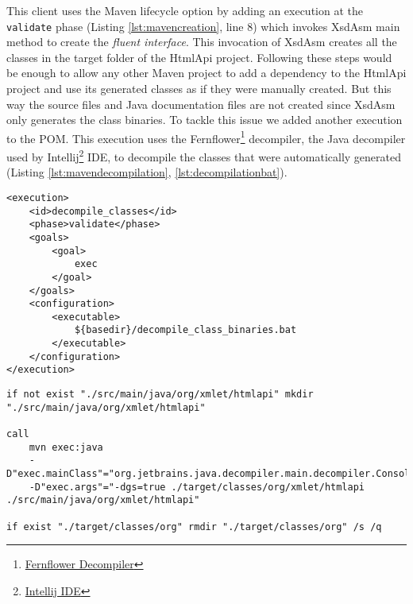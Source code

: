 \noindent
This client uses the Maven lifecycle option by adding an execution at the \texttt{validate} phase (Listing \ref{lst:mavencreation}, line 8) which invokes XsdAsm main method to create the \textit{fluent interface}. This invocation of XsdAsm creates all the classes in the target folder of the HtmlApi project. Following these steps would be enough to allow any other Maven project to add a dependency to the HtmlApi project and use its generated classes as if they were manually created. But this way the source files and Java documentation files are not created since XsdAsm only generates the class binaries. To tackle this issue we added another execution to the \ac{POM}. This execution uses the Fernflower\footnote{\href{https://mvnrepository.com/artifact/org.jboss.windup.decompiler/decompiler-fernflower/4.0.0.Final}{Fernflower Decompiler}} decompiler, the Java decompiler used by Intellij\footnote{\href{https://www.jetbrains.com/idea/}{Intellij IDE}} \ac{IDE}, to decompile the classes that were automatically generated (Listing \ref{lst:mavendecompilation}, \ref{lst:decompilationbat}). 

\bigskip


\begin{minipage}{\linewidth}
\begin{lstlisting}[caption={Maven API decompile classes plugin},label={lst:mavendecompilation}]
<execution>
    <id>decompile_classes</id>
    <phase>validate</phase>
    <goals>
        <goal>
            exec
        </goal>
    </goals>
    <configuration>
        <executable>
            ${basedir}/decompile_class_binaries.bat
        </executable>
    </configuration>
</execution>
\end{lstlisting}
\end{minipage}


\begin{minipage}{\linewidth}
\begin{lstlisting}[caption={Maven API decompile batch file (decompile\_class\_binaries.bat)},label={lst:decompilationbat}]
if not exist "./src/main/java/org/xmlet/htmlapi" mkdir "./src/main/java/org/xmlet/htmlapi"

call 
    mvn exec:java 
    -D"exec.mainClass"="org.jetbrains.java.decompiler.main.decompiler.ConsoleDecompiler" 
    -D"exec.args"="-dgs=true ./target/classes/org/xmlet/htmlapi ./src/main/java/org/xmlet/htmlapi"

if exist "./target/classes/org" rmdir "./target/classes/org" /s /q
\end{lstlisting}
\end{minipage}

